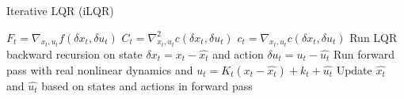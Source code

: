 \begin{algorithm}[t!]
\caption{Iterative LQR (iLQR)}
\begin{algorithmic}[1]
\label{alg:ilqr}
    \STATE $F_t = \nabla_{x_t,u_t}f(\delta x_t, \delta u_t)$
    \STATE $C_t = \nabla^2_{x_t,u_t}c(\delta x_t, \delta u_t)$
    \STATE $c_t = \nabla_{x_t,u_t}c(\delta x_t, \delta u_t)$
    \STATE Run LQR backward recursion on state $\delta x_t = x_t - \hat{x_t}$ and action $\delta u_t = u_t - \hat{u_t}$
    \STATE Run forward pass with real nonlinear dynamics and $u_t = K_t(x_t-\hat{x_t}) + k_t + \hat{u_t}$
    \STATE Update $\hat{x_t}$ and $\hat{u_t}$ based on states and actions in forward pass
    \ENDWHILE
\end{algorithmic}
\end{algorithm}
